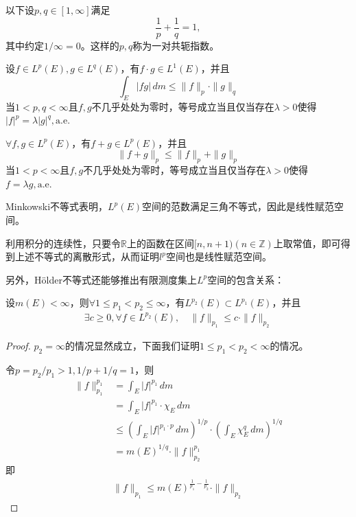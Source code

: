 以下设$p,q\in[1,\infty]$满足
\[\frac{1}{p}+\frac{1}{q}=1,\]
其中约定$1/\infty=0$。这样的$p,q$称为一对共轭指数。

\begin{theorem}[Hölder不等式]\label{thm:holder}
    设$f\in L^p(E),g\in L^q(E)$，有$f\cdot g\in L^1(E)$，并且
    \[\int_{E}|fg|\,dm\leq \|f\|_p\cdot \|g\|_q\]
    当$1<p,q<\infty$且$f,g$不几乎处处为零时，等号成立当且仅当存在$\lambda>0$使得$|f|^p=\lambda |g|^q,\mathrm{a.e.}$
\end{theorem}

\begin{theorem}[Minkowski不等式]\label{thm:minkowski}
    $\forall f,g\in L^p(E)$，有$f+g\in L^p(E)$，并且
    \[\|f+g\|_p\leq \|f\|_p+\|g\|_p\]
    当$1<p<\infty$且$f,g$不几乎处处为零时，等号成立当且仅当存在$\lambda>0$使得$f=\lambda g,\mathrm{a.e.}$
\end{theorem}

Minkowski不等式表明，$L^p(E)$空间的范数满足三角不等式，因此是线性赋范空间。

利用积分的连续性，只要令$\mathbb{R} $上的函数在区间$[n,n+1)(n\in\mathbb{Z} )$上取常值，即可得到上述不等式的离散形式，从而证明$l^p$空间也是线性赋范空间。

另外，Hölder不等式还能够推出有限测度集上$L^p$空间的包含关系：
\begin{corollary}
    设$m(E)<\infty$，则$\forall 1\leq p_1<p_2\leq \infty$，有$L^{p_2}(E)\subset L^{p_1}(E)$，并且\begin{align*}
        \exists c\geq 0,\forall f\in L^{p_2}(E),\quad\|f\|_{p_1}\leq c\cdot \|f\|_{p_2}
    \end{align*}
\end{corollary}
\begin{proof}
    $p_2=\infty$的情况显然成立，下面我们证明$1\leq p_1<p_2<\infty$的情况。

    令$p=p_2/p_1>1,1/p+1/q=1$，则\begin{align*}
        \|f\|_{p_1}^{p_1} & =\int_{E}|f|^{p_1}\,dm                                                                            \\
                          & =\int_{E}|f|^{p_1}\cdot \chi_E\,dm                                                                \\
                          & \leq \left(\int_{E}|f|^{p_1\cdot p}\,dm\right)^{1/p}\cdot \left(\int_{E}\chi_E^q\,dm\right)^{1/q} \\
                          & =m(E)^{1/q}\cdot \|f\|_{p_2}^{p_1}
    \end{align*}
    即\begin{align*}
        \|f\|_{p_1}\leq m(E)^{\frac{1}{p_1}-\frac{1}{p_2}}\cdot \|f\|_{p_2}
    \end{align*}
\end{proof}

